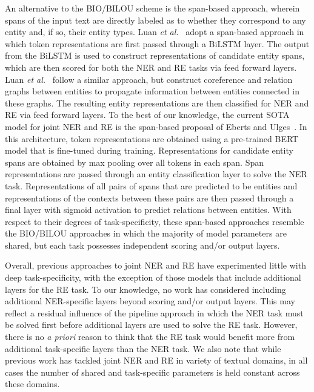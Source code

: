 \documentclass{article}
\begin{document}
An alternative to the BIO/BILOU scheme is the span-based approach, wherein spans of the input text are directly labeled as to whether they correspond to any entity and, if so, their entity types. Luan {\em et al.}~ adopt a span-based approach in which token representations are first passed through a BiLSTM layer. The output from the BiLSTM is used to construct representations of candidate entity spans, which are then scored for both the NER and RE tasks via feed forward layers. Luan {\em et al.}~ follow a similar approach, but construct coreference and relation graphs between entities to propagate information between entities connected in these graphs. The resulting entity representations are then classified for NER and RE via feed forward layers. To the best of our knowledge, the current SOTA model for joint NER and RE is the span-based proposal of Eberts and Ulges~. In this architecture, token representations are obtained using a pre-trained BERT model that is fine-tuned during training. Representations for candidate entity spans are obtained by max pooling over all tokens in each span. Span representations are passed through an entity classification layer to solve the NER task. Representations of all pairs of spans that are predicted to be entities and representations of the contexts between these pairs are then passed through a final layer with sigmoid activation to predict relations between entities. With respect to their degrees of task-specificity, these span-based approaches resemble the BIO/BILOU approaches in which the majority of model parameters are shared, but each task possesses independent scoring and/or output layers. 

Overall, previous approaches to joint NER and RE have experimented little with deep task-specificity, with the exception of those models that include additional layers for the RE task. To our knowledge, no work has considered including additional NER-specific layers beyond scoring and/or output layers. This may reflect a residual influence of the pipeline approach in which the NER task must be solved first before additional layers are used to solve the RE task. However, there is no {\em a priori} reason to think that the RE task would benefit more from additional task-specific layers than the NER task. We also note that while previous work has tackled joint NER and RE in variety of textual domains, in all cases the number of shared and task-specific parameters is held constant across these domains.
\end{document}

